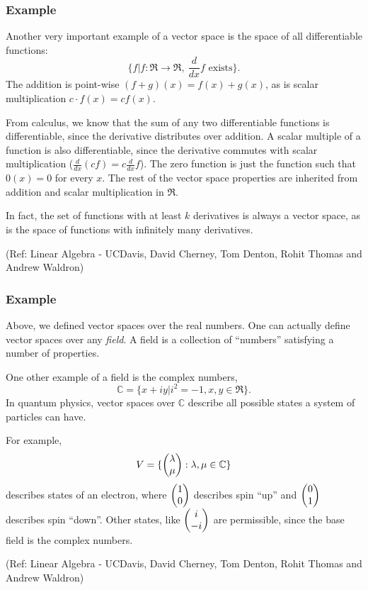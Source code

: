 \begin{frame}[fragile]
\frametitle{Example}
\begin{example}
Another very important example of a vector space is the space of all differentiable functions: 
\[
\{f | f:\Re\rightarrow \Re,\ \frac{d}{dx}f \text{ exists} \}.
\]
The addition is point-wise $(f+g)(x)=f(x)+g(x)$, as is scalar multiplication $c\cdot f(x)=cf(x)$.  

From calculus, we know that the sum of any two differentiable functions is differentiable, since the derivative distributes over addition.  A scalar multiple of a function is also differentiable, since the derivative commutes with scalar multiplication ($\frac{d}{d x}(cf)=c\frac{d}{dx}f$).  The zero function is just the function such that $0(x)=0$ for every $x$.  The rest of the vector space properties are inherited from addition and scalar multiplication in $\Re$.

In fact, the set of functions with at least $k$ derivatives is always a vector space, as is the space of functions with infinitely many derivatives.
\end{example}

\tiny{(Ref: Linear Algebra - UCDavis, David Cherney, Tom Denton, Rohit Thomas and Andrew Waldron)}


\end{frame}

\begin{frame}[fragile]
\frametitle{Example}
\begin{remark}  Above, we defined vector spaces over the real numbers.  One can actually define vector spaces over any \emph{field}.  A field is a collection of ``numbers'' satisfying a number of properties.

\end{remark}

One other example of a field is the complex numbers, 
\[
\mathbb{C}= \{x+iy | i^2=-1, x,y\in \Re \}.
\]
In quantum physics, vector spaces over $\mathbb{C}$ describe all possible states a system of particles can have.  

For example,
\[
V= \{ \begin{pmatrix}\lambda \\ \mu\end{pmatrix} : \lambda, \mu \in \mathbb{C}\}
\]
describes states of an electron, where $\begin{pmatrix}1 \\ 0\end{pmatrix}$ describes spin ``up'' and $\begin{pmatrix}0 \\ 1\end{pmatrix}$ describes spin ``down''.  Other states, like $\begin{pmatrix}i \\ -i\end{pmatrix}$ are permissible, since the base field is the complex numbers.

\tiny{(Ref: Linear Algebra - UCDavis, David Cherney, Tom Denton, Rohit Thomas and Andrew Waldron)}
\end{frame}

